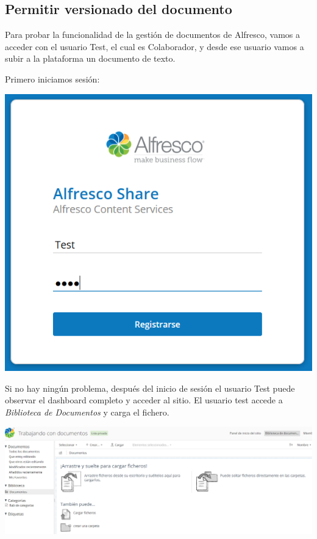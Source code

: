 \documentclass{article}
\begin{document}
\subsection{Permitir versionado del documento}

Para probar la funcionalidad de la gestión de documentos de Alfresco, vamos a acceder con el usuario Test, el cual es Colaborador, y desde ese usuario vamos a subir a la plataforma un documento de texto.

Primero iniciamos sesión:

\begin{center}
\includegraphics[scale=0.5]{images/session.png}
\end{center}

Si no hay ningún problema, después del inicio de sesión el usuario Test puede observar el dashboard completo y acceder al sitio. El usuario test accede a \textit{Biblioteca de Documentos} y carga el fichero.

\begin{center}
\includegraphics[scale=0.25]{images/files.png}
\end{center}
\end{document}
